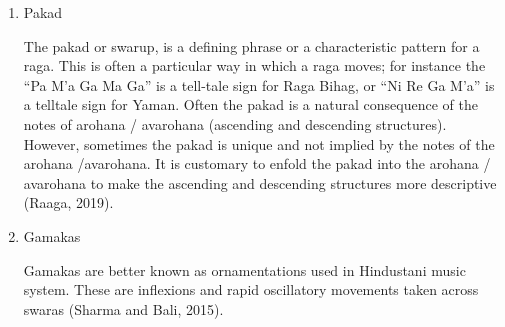 \begin{enumerate}
  \par
  \item Pakad \par
  The pakad or swarup, is a defining phrase or a characteristic pattern for a raga.  This is often a particular way in which a raga moves; for instance the ``Pa M'a Ga Ma Ga'' is a tell-tale sign for Raga Bihag, or ``Ni Re Ga M'a'' is a telltale sign for Yaman.  Often the pakad is a natural consequence of the notes of arohana / avarohana (ascending and descending structures).  However, sometimes the pakad is unique and not implied by the notes of the arohana /avarohana.  It is customary to enfold the pakad into the arohana / avarohana to make the ascending and descending structures more descriptive (Raaga, 2019).
  \par
  \item Gamakas \par
  Gamakas are better known as ornamentations used in Hindustani music system. These are inflexions and rapid oscillatory movements taken across swaras (Sharma and Bali, 2015).
\end{enumerate}
\par

